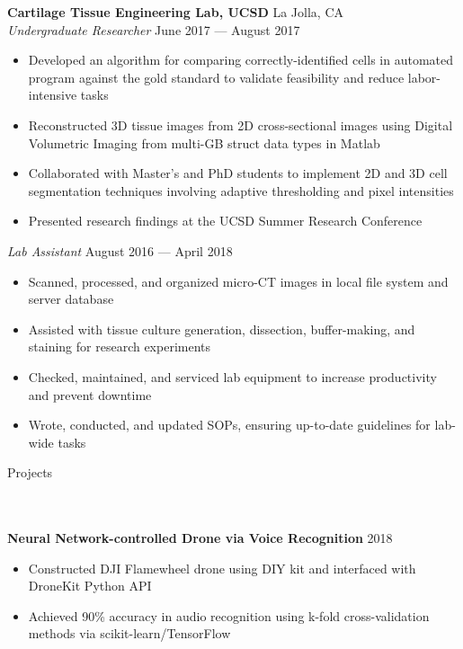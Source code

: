 \documentclass{article}
\newcommand{\lineunder} {
    \vspace*{-8pt} \\
    \hspace*{-18pt} \hrulefill \\
}
\newcommand{\header} [1] {
    {\hspace*{-18pt}\vspace*{6pt} \Large{#1} }
    \vspace*{-6pt} 
    \lineunder
}
\begin{document}

\textbf{Cartilage Tissue Engineering Lab, UCSD} \hfill La Jolla, CA\\
\textit{Undergraduate Researcher} \hfill June 2017 --- August 2017\\
\vspace{-2mm}
\begin{itemize} \itemsep 0.05pt
	\item Developed an algorithm for comparing correctly-identified cells in automated program against the gold standard to validate feasibility and reduce labor-intensive tasks
	\item Reconstructed 3D tissue images from 2D cross-sectional images using Digital Volumetric Imaging from multi-GB struct data types in Matlab
	\item Collaborated with Master’s and PhD students to implement 2D and 3D cell segmentation techniques involving adaptive thresholding and pixel intensities
	\item Presented research findings at the UCSD Summer Research Conference
\end{itemize}


\textit{Lab Assistant} \hfill August 2016 --- April 2018\\
\vspace{-2mm}
\begin{itemize} \itemsep 0.05pt
	\item Scanned, processed, and organized micro-CT images in local file system and server database
	\item Assisted with tissue culture generation, dissection, buffer-making, and staining for research experiments
	\item Checked, maintained, and serviced lab equipment to increase productivity and prevent downtime
	\item Wrote, conducted, and updated SOPs, ensuring up-to-date guidelines for lab-wide tasks
\end{itemize}

\header{Projects}
\textbf{Neural Network-controlled Drone via Voice Recognition} \hfill 2018
\vspace{-2mm}
\begin{itemize} \itemsep 0.05pt
	\item Constructed DJI Flamewheel drone using DIY kit and interfaced with DroneKit Python API
	\item Achieved 90\% accuracy in audio recognition using k-fold cross-validation methods via scikit-learn/TensorFlow
\end{itemize}
\end{document}

